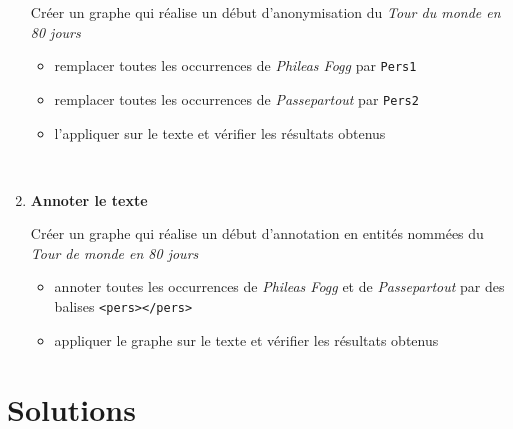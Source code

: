 \documentclass[xcolor={table,usenames,dvipsnames}]{article}
\begin{document}
\begin{enumerate}
Créer un graphe qui réalise un début d'anonymisation du \textit{Tour du monde en 80 jours}
	\begin{itemize}
	\item remplacer toutes les occurrences de \textit{Phileas Fogg} par \texttt{Pers1}
	\item remplacer toutes les occurrences de \textit{Passepartout} par \texttt{Pers2}
	\item l'appliquer sur le texte et vérifier les résultats obtenus
\end{itemize}

\\
\bigskip


\item \textbf{Annoter le texte}

Créer un graphe qui réalise un début d'annotation en entités nommées du \textit{Tour de monde en 80 jours}
	\begin{itemize}
	\item annoter toutes les occurrences de \textit{Phileas Fogg} et de \textit{Passepartout} par des balises \texttt{<pers></pers>}
	\item appliquer le graphe sur le texte et vérifier les résultats obtenus
\end{itemize}
\end{enumerate}






\section{Solutions}
\end{document}
